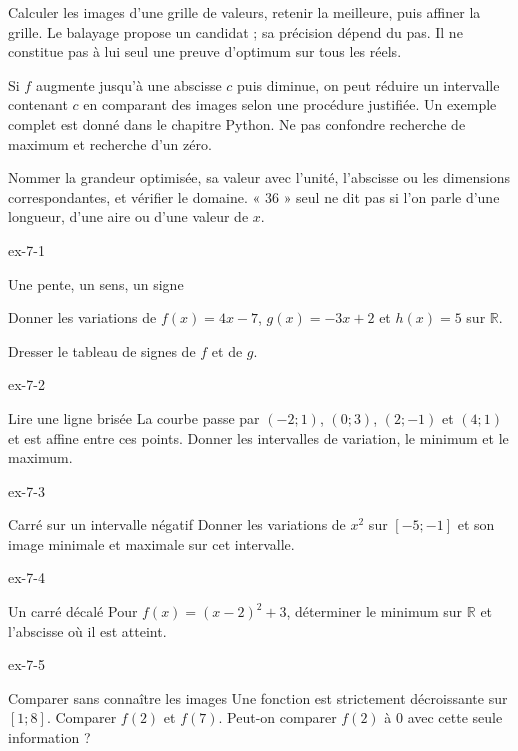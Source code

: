 \begin{savoirfaire}
Calculer les images d’une grille de valeurs, retenir la meilleure, puis affiner la grille. Le balayage propose un candidat ; sa précision dépend du pas. Il ne constitue pas à lui seul une preuve d’optimum sur tous les réels.
\end{savoirfaire}
\begin{exemple}
Si $f$ augmente jusqu’à une abscisse $c$ puis diminue, on peut réduire un intervalle contenant $c$ en comparant des images selon une procédure justifiée. Un exemple complet est donné dans le chapitre Python. Ne pas confondre recherche de maximum et recherche d’un zéro.
\end{exemple}
Nommer la grandeur optimisée, sa valeur avec l’unité, l’abscisse ou les dimensions correspondantes, et vérifier le domaine. « 36 » seul ne dit pas si l’on parle d’une longueur, d’une aire ou d’une valeur de $x$.
\clearpage{}
\begin{blocLivre}{ex-7-1}
\begin{exercice}[1]{Une pente, un sens, un signe}
\begin{questions}
\item Donner les variations de $f(x)=4x-7$, $g(x)=-3x+2$ et $h(x)=5$ sur $\mathbb R$.
\item Dresser le tableau de signes de $f$ et de $g$.
\end{questions}
\end{exercice}
\end{blocLivre}
\begin{blocLivre}{ex-7-2}
\begin{exercice}[1]{Lire une ligne brisée}
La courbe passe par $(-2;1)$, $(0;3)$, $(2;-1)$ et $(4;1)$ et est affine entre ces points. Donner les intervalles de variation, le minimum et le maximum.
\label{fig-ex-7-2}
\end{exercice}
\end{blocLivre}
\begin{blocLivre}{ex-7-3}
\begin{exercice}[1]{Carré sur un intervalle négatif}
Donner les variations de $x^2$ sur $[-5;-1]$ et son image minimale et maximale sur cet intervalle.
\end{exercice}
\end{blocLivre}
\begin{blocLivre}{ex-7-4}
\begin{exercice}[1]{Un carré décalé}
Pour $f(x)=(x-2)^2+3$, déterminer le minimum sur $\mathbb R$ et l’abscisse où il est atteint.
\end{exercice}
\end{blocLivre}
\begin{blocLivre}{ex-7-5}
\begin{exercice}[1]{Comparer sans connaître les images}
Une fonction est strictement décroissante sur $[1;8]$. Comparer $f(2)$ et $f(7)$. Peut-on comparer $f(2)$ à 0 avec cette seule information ?
\end{exercice}
\end{blocLivre}

